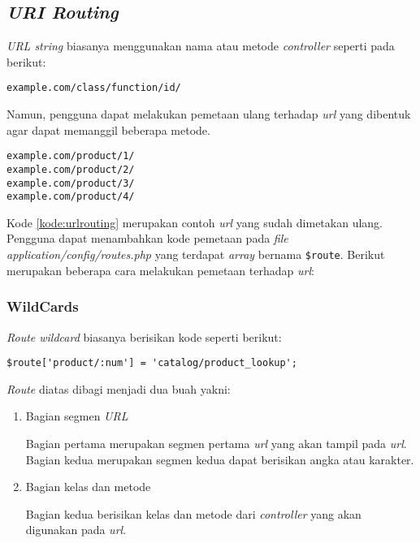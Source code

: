 \subsection{\textit{URI Routing}}
\textit{URL string} biasanya menggunakan nama atau metode \textit{controller} seperti pada berikut:

\begin{center}
\verb|example.com/class/function/id/|
\end{center}

Namun, pengguna dapat melakukan pemetaan ulang terhadap \textit{url} yang dibentuk agar dapat memanggil beberapa metode.

\begin{lstlisting}[caption=Contoh \textit{url} yang sudah dimetakan,label=kode:urlrouting]
example.com/product/1/
example.com/product/2/
example.com/product/3/
example.com/product/4/
\end{lstlisting}

Kode \ref{kode:urlrouting} merupakan contoh \textit{url} yang sudah dimetakan ulang. Pengguna dapat menambahkan kode pemetaan pada \textit{file application/config/routes.php} yang terdapat \textit{array} bernama \verb|$route|. Berikut merupakan beberapa cara melakukan pemetaan terhadap \textit{url}:

\subsubsection{WildCards}

\textit{Route wildcard} biasanya berisikan kode seperti berikut:

\begin{center}
\verb|$route['product/:num'] = 'catalog/product_lookup';|
\end{center}

\textit{Route} diatas dibagi menjadi dua buah yakni:
\begin{enumerate}
\item Bagian segmen \textit{URL}

Bagian pertama merupakan segmen pertama \textit{url} yang akan tampil pada \textit{url}. Bagian kedua merupakan segmen kedua dapat berisikan angka atau karakter.

\item Bagian kelas dan metode

Bagian kedua berisikan kelas dan metode dari \textit{controller} yang akan digunakan pada \textit{url}.

\end{enumerate} 

